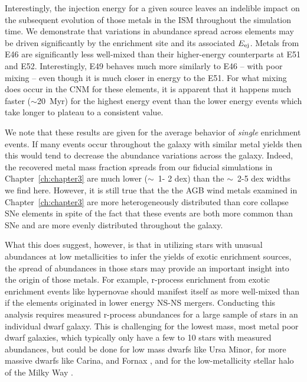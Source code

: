 Interestingly, the injection energy for a given source leaves an indelible impact on the subsequent evolution of those metals in the ISM throughout the simulation time. We demonstrate that variations in abundance spread across elements may be driven significantly by the enrichment site and its associated $E_{\rm ej}$. Metals from \runone E46 are significantly less well-mixed than their higher-energy counterparts at \runone E51 and \runone E52. Interestingly, \runone E49 behaves much more similarly to \runone E46 -- with poor mixing -- even though it is much closer in energy to the \runone E51. For what mixing does occur in the CNM for these elements, it is apparent that it happens much faster ($\sim$20~Myr) for the highest energy event than the lower energy events which take longer to plateau to a consistent value.

We note that these results are given for the average behavior of \textit{single} enrichment events. If many events occur throughout the galaxy with similar metal yields then this would tend to decrease the abundance variations across the galaxy. Indeed, the recovered metal mass fraction spreads from our fiducial simulations in Chapter~\ref{ch:chapter3} are much lower ($\sim$~1- 2 dex) than the $\sim$~2-5 dex widths we find here. However, it is still true that the the AGB wind metals examined in Chapter~\ref{ch:chapter3} are more heterogeneously distributed than core collapse SNe elements in spite of the fact that these events are both more common than SNe and are more evenly distributed throughout the galaxy.

What this does suggest, however, is that in utilizing stars with unusual abundances at low metallicities to infer the yields of exotic enrichment sources, the spread of abundances in those stars may provide an important insight into the origin of those metals. For example, r-process enrichment from exotic enrichment events like hypernovae should manifest itself as more well-mixed than if the elements originated in lower energy NS-NS mergers. Conducting this analysis requires measured r-process abundances for a large sample of stars in an individual dwarf galaxy. This is challenging for the lowest mass, most metal poor dwarf galaxies, which typically only have a few to 10 stars with measured abundances, but could be done for low mass dwarfs like Ursa Minor, for more massive dwarfs like Carina, and Fornax \citep{Suda2017}, and for the low-metallicity stellar halo of the Milky Way \citep[e.g.][]{Hansen2018,Sakari2018}.


